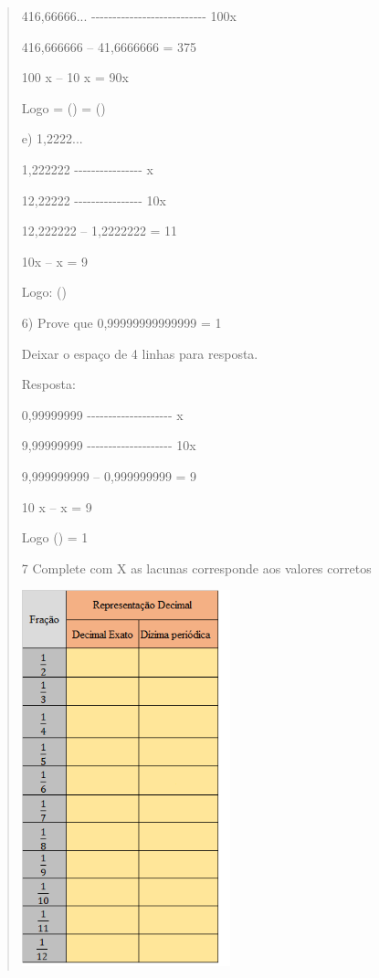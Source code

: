 \begin{quote}
416,66666...
-\/-\/-\/-\/-\/-\/-\/-\/-\/-\/-\/-\/-\/-\/-\/-\/-\/-\/-\/-\/-\/-\/-\/-\/-\/-\/-
100x

416,666666 -- 41,6666666 = 375

100 x -- 10 x = 90x

Logo = () = ()

e) 1,2222...

1,222222 -\/-\/-\/-\/-\/-\/-\/-\/-\/-\/-\/-\/-\/-\/-\/- x

12,22222 -\/-\/-\/-\/-\/-\/-\/-\/-\/-\/-\/-\/-\/-\/-\/- 10x

12,222222 -- 1,2222222 = 11

10x -- x = 9

Logo: ()

6) Prove que 0,99999999999999 = 1

Deixar o espaço de 4 linhas para resposta.

Resposta:

0,99999999 -\/-\/-\/-\/-\/-\/-\/-\/-\/-\/-\/-\/-\/-\/-\/-\/-\/-\/-\/- x

9,99999999 -\/-\/-\/-\/-\/-\/-\/-\/-\/-\/-\/-\/-\/-\/-\/-\/-\/-\/-\/-
10x

9,999999999 -- 0,999999999 = 9

10 x -- x = 9

Logo () = 1

\num{7} Complete com X as lacunas corresponde aos valores corretos

\includegraphics[width=2.37378in,height=4.29167in]{./imgSAEB_8_MAT/media/image3.png}


\end{quote}
